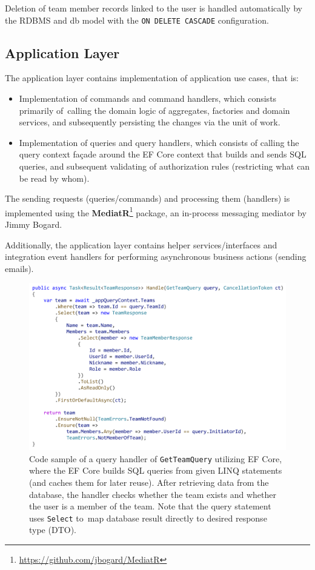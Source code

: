 Deletion of team member records linked to the user is handled automatically by the RDBMS and db model with the \texttt{ON DELETE CASCADE} configuration.

\subsection{Application Layer}
The application layer contains implementation of application use cases, that is:

\begin{itemize}
    \item Implementation of commands and command handlers, which consists primarily of~calling the domain logic of aggregates, factories and domain services, and subsequently persisting the changes via the unit of work.
    \item Implementation of queries and query handlers, which consists of calling the query context façade around the EF Core context that builds and sends SQL queries, and subsequent validating of authorization rules (restricting what can be read by whom).
\end{itemize}

The sending requests (queries/commands) and processing them (handlers) is implemented using the \textbf{MediatR}\footnote{\url{https://github.com/jbogard/MediatR}} package, an in-process messaging mediator by Jimmy Bogard.

Additionally, the application layer contains helper services/interfaces and integration event handlers for performing asynchronous business actions (sending emails).

\begin{figure} [H]
    \centering
    \includegraphics[width=\textwidth]{figures/query-handler.pdf}
    \caption{Code sample of a query handler of \texttt{GetTeamQuery} utilizing EF Core, where the EF Core builds SQL queries from given LINQ statements (and caches them for later reuse). After retrieving data from the database, the handler checks whether the team exists and whether the user is a member of the team. Note that the query statement uses \texttt{Select} to~map database result directly to desired response type (DTO).}
    \label{fig:query_handler}
\end{figure}

